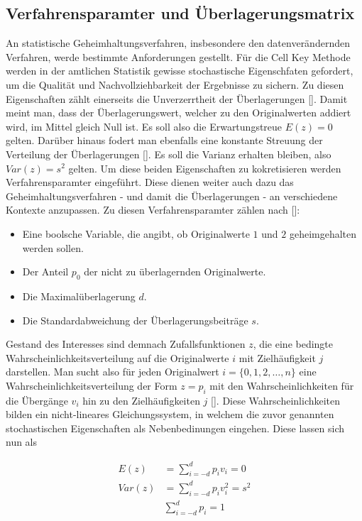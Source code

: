\subsection{Verfahrensparamter und Überlagerungsmatrix}

An statistische Geheimhaltungsverfahren, insbesondere den datenverändernden Verfahren, werde bestimmte Anforderungen gestellt. Für die Cell Key Methode werden in der amtlichen Statistik gewisse stochastische Eigenschfaten gefordert, um die Qualität und Nachvollziehbarkeit der Ergebnisse zu sichern. Zu diesen Eigenschaften zählt einerseits die Unverzerrtheit der Überlagerungen [\cite{Enderle}]. Damit meint man, dass der Überlagerungswert, welcher zu den Originalwerten addiert wird, im Mittel gleich Null ist. Es soll also die Erwartungstreue $E(z) = 0$ gelten. Darüber hinaus fodert man ebenfalls eine konstante Streuung der Verteilung der Überlagerungen [\cite{Enderle}]. Es soll die Varianz erhalten bleiben, also $Var(z) = s^2$ gelten. Um diese beiden Eigenschaften zu kokretisieren werden Verfahrensparamter eingeführt. Diese dienen weiter auch dazu das Geheimhaltungsverfahren - und damit die Überlagerungen - an verschiedene Kontexte anzupassen. Zu diesen Verfahrensparamter zählen nach [\cite{Höhne}]:

\begin{itemize}
    \item Eine boolsche Variable, die angibt, ob Originalwerte $1$ und $2$ geheimgehalten werden sollen.
    \item Der Anteil $p_0$ der nicht zu überlagernden Originalwerte.
    \item Die Maximalüberlagerung $d$.
    \item Die Standardabweichung der Überlagerungsbeiträge $s$.
\end{itemize}

Gestand des Interesses sind demnach Zufallsfunktionen $z$, die eine bedingte Wahrscheinlichkeitsverteilung auf die Originalwerte $i$ mit Zielhäufigkeit $j$ darstellen. Man sucht also für jeden Originalwert $i = \{0, 1, 2, \dots, n \}$ eine Wahrscheinlichkeitsverteilung der Form $z = p_i$ mit den Wahrscheinlichkeiten für die Übergänge $v_i$ hin zu den Zielhäufigkeiten $j$ [\cite{Enderle}]. Diese Wahrscheinlichkeiten bilden ein nicht-lineares Gleichungssystem, in welchem die zuvor genannten stochastischen Eigenschaften als Nebenbedinungen eingehen. Diese lassen sich nun als 

\begin{align}
    E(z) & = \sum_{i = -d}^{d} p_i v_i = 0 \\
    Var(z) & = \sum_{i = -d}^{d} p_i v_{i}^{2} = s^2 \\
    & \sum_{i = -d}^{d} p_i = 1
\end{align}

